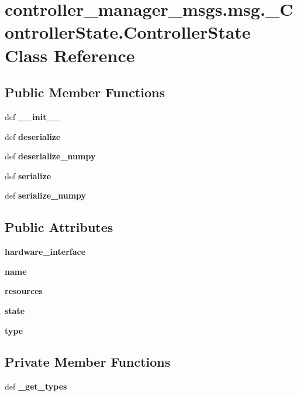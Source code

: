 \section{controller\-\_\-manager\-\_\-msgs.\-msg.\-\_\-\-Controller\-State.\-Controller\-State \-Class \-Reference}
\label{classcontroller__manager__msgs_1_1msg_1_1__ControllerState_1_1ControllerState}
\subsection*{\-Public \-Member \-Functions}
\begin{DoxyCompactItemize}
\item 
def {\bf \-\_\-\-\_\-init\-\_\-\-\_\-}
\item 
def {\bf deserialize}
\item 
def {\bf deserialize\-\_\-numpy}
\item 
def {\bf serialize}
\item 
def {\bf serialize\-\_\-numpy}
\end{DoxyCompactItemize}
\subsection*{\-Public \-Attributes}
\begin{DoxyCompactItemize}
\item 
{\bf hardware\-\_\-interface}
\item 
{\bf name}
\item 
{\bf resources}
\item 
{\bf state}
\item 
{\bf type}
\end{DoxyCompactItemize}
\subsection*{\-Private \-Member \-Functions}
\begin{DoxyCompactItemize}
\item 
def {\bf \-\_\-get\-\_\-types}
\end{DoxyCompactItemize}
